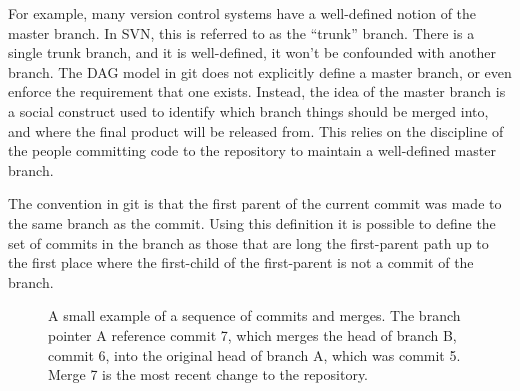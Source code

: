 For example, many version control systems have a well-defined notion of
the master branch.
In SVN, this is referred to as the ``trunk'' branch.
There is a single trunk branch, and it is well-defined, it won't be
confounded with another branch.
The DAG model in git does not explicitly define a master branch, or even
enforce the requirement that one exists.
Instead, the idea of the master branch is a social construct used to
identify which branch things should be merged into, and where the final
product will be released from.
This relies on the discipline of the people committing code to the
repository to maintain a well-defined master branch.

The convention in git is that the first parent of the current commit was
made to the same branch as the commit. Using this definition it is
possible to define the set of commits in the branch as those that are
long the first-parent path up to the first place where the first-child
of the first-parent is not a commit of the branch.

\begin{figure}[htbp]
  \centering
  \caption{A small example of a sequence of commits and merges.
    The branch pointer A reference commit 7, which merges the head of
    branch B, commit 6, into the original head of branch A, which was
    commit 5. Merge 7 is the most recent change to the repository.}
  \label{fig:repoEvents2}
\end{figure}


